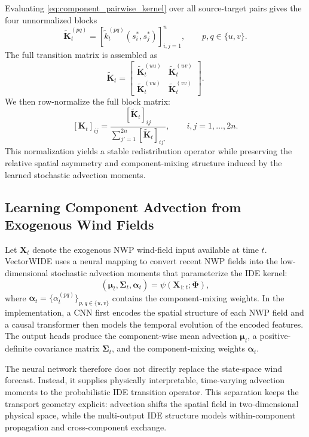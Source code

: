Evaluating \eqref{eq:component_pairwise_kernel} over all source-target pairs
gives the four unnormalized blocks
\[
\widetilde{\mathbf K}_t^{(pq)}
=
\left[
\widetilde{k}_t^{(pq)}(s_i^\ast,s_j^\ast)
\right]_{i,j=1}^n,
\qquad p,q\in\{u,v\}.
\]
The full transition matrix is assembled as
\begin{equation}
\widetilde{\mathbf K}_t
=
\begin{bmatrix}
\widetilde{\mathbf K}_t^{(uu)} & \widetilde{\mathbf K}_t^{(uv)}\\
\widetilde{\mathbf K}_t^{(vu)} & \widetilde{\mathbf K}_t^{(vv)}
\end{bmatrix}.
\end{equation}
We then row-normalize the full block matrix:
\begin{equation}
\left[\mathbf K_t\right]_{ij}
=
\frac{
\left[\widetilde{\mathbf K}_t\right]_{ij}
}{
\sum_{j'=1}^{2n}
\left[\widetilde{\mathbf K}_t\right]_{ij'}
},
\qquad i,j=1,\ldots,2n.
\end{equation}
This normalization yields a stable redistribution operator while preserving the
relative spatial asymmetry and component-mixing structure induced by the
learned stochastic advection moments.

\subsection{Learning Component Advection from Exogenous Wind Fields}
\label{subsec:component_advection_learning}

Let \(\mathbf X_t\) denote the exogenous NWP wind-field input available at time
\(t\). VectorWIDE uses a neural mapping to convert recent NWP fields into the
low-dimensional stochastic advection moments that parameterize the IDE kernel:
\begin{equation}
(\boldsymbol\mu_t,\boldsymbol\Sigma_t,\boldsymbol\alpha_t)
=
\psi(\mathbf X_{1:t};\boldsymbol\Phi),
\label{eq:component_deep_mapping}
\end{equation}
where \(\boldsymbol\alpha_t=\{\alpha_t^{(pq)}\}_{p,q\in\{u,v\}}\) contains the
component-mixing weights. In the implementation, a CNN first encodes the
spatial structure of each NWP field and a causal transformer then models the
temporal evolution of the encoded features. The output heads produce the
component-wise mean advection \(\boldsymbol\mu_t\), a positive-definite
covariance matrix \(\boldsymbol\Sigma_t\), and the component-mixing weights
\(\boldsymbol\alpha_t\).

The neural network therefore does not directly replace the state-space wind
forecast. Instead, it supplies physically interpretable, time-varying
advection moments to the probabilistic IDE transition operator. This separation
keeps the transport geometry explicit: advection shifts the spatial field in
two-dimensional physical space, while the multi-output IDE structure models
within-component propagation and cross-component exchange.
